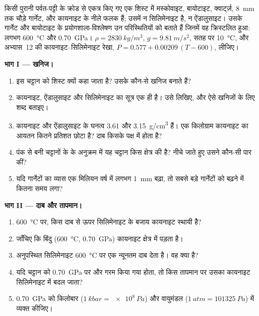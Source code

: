 \begin{problem}[{सप्ताहांत समस्या --- एक कायनाइट शिस्ट का इतिहास}]
\label{pb:g12:metamorphic-rocks:1}
किसी पुरानी पर्वत-पट्टी के क्रोड से एकत्र किए गए एक शिस्ट में मस्कोवाइट,
बायोटाइट, क्वार्ट्ज़, \qty{8}{mm} तक चौड़े गार्नेट, और कायनाइट के नीले
फलक हैं; उसमें न सिलिमेनाइट है, न ऐंडालुसाइट। उसके गार्नेट और बायोटाइट के
प्रयोगशाला-विश्लेषण उन परिस्थितियों को बताते हैं जिनमें वह क्रिस्टलित हुआ:
लगभग \qty{600}{\celsius} और \qty{0.70}{GPa}। $\rho =
\qty{2830}{kg/m^3}$, $g = \qty{9.81}{m/s^2}$, सतह पर \qty{10}{\celsius},
और अभ्यास~12 की कायनाइट--सिलिमेनाइट रेखा, $P = 0.577 +
0.00209\,(T - 600)$, लीजिए।

\medskip
\noindent\textbf{भाग I --- खनिज।}
\begin{enumerate}
  \item इस चट्टान को शिस्ट क्यों कहा जाता है? उसके कौन-से खनिज
         बनाते हैं?
  \item कायनाइट, ऐंडालुसाइट और सिलिमेनाइट का सूत्र एक ही है। उसे लिखिए, और
        ऐसे खनिजों के लिए शब्द बताइए।
  \item कायनाइट और ऐंडालुसाइट के घनत्व \num{3.61} और
        \qty{3.15}{g/cm^3} हैं। एक किलोग्राम कायनाइट का आयतन कितने प्रतिशत
        छोटा है? दाब किसके पक्ष में होता है?
  \item पंक से बनी चट्टानों के  के अनुक्रम में यह चट्टान किस क्षेत्र
        की है? नीचे जाते हुए उसने कौन-सी  पार कीं?
  \item यदि गार्नेटों का व्यास एक मिलियन वर्ष में लगभग \qty{1}{mm}
        बढ़ा, तो सबसे बड़े गार्नेटों को बढ़ने में कितना समय लगा?
\end{enumerate}

\medskip
\noindent\textbf{भाग II --- दाब और तापमान।}
\begin{enumerate}[resume]
  \item \qty{600}{\celsius} पर, किस दाब से ऊपर सिलिमेनाइट के बजाय कायनाइट
        स्थायी है?
  \item जाँचिए कि बिंदु (\qty{600}{\celsius}, \qty{0.70}{GPa})
        कायनाइट क्षेत्र में पड़ता है।
  \item अनुपस्थित सिलिमेनाइट \qty{600}{\celsius} पर एक न्यूनतम
        दाब देता है। वह क्या है?
  \item यदि चट्टान को \qty{0.70}{GPa} पर और गरम किया गया होता, तो किस
        तापमान पर उसका कायनाइट सिलिमेनाइट में बदल जाता?
  \item \qty{0.70}{GPa} को किलोबार ($\qty{1}{kbar} =
        \qty{e8}{Pa}$) और वायुमंडल ($\qty{1}{atm} = \qty{101325}{Pa}$) में व्यक्त कीजिए।
\end{enumerate}


\end{problem}
